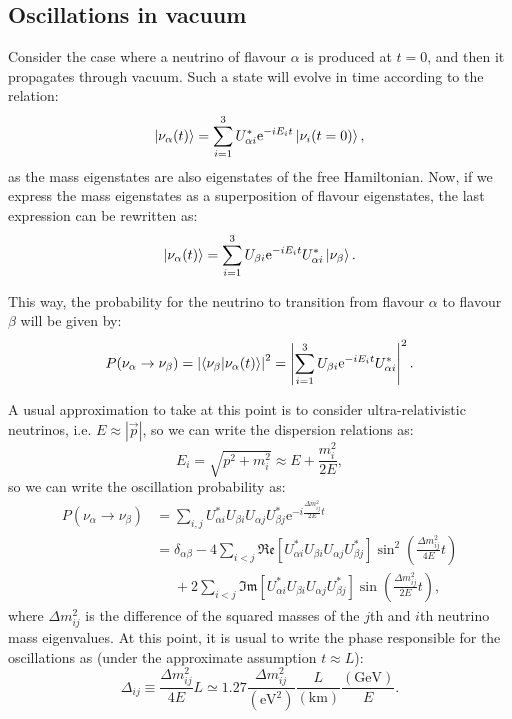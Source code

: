 \subsection{Oscillations in vacuum}

Consider the case where a neutrino of flavour $\alpha$ is produced at $t=0$, and then it propagates through vacuum. Such a state will evolve in time according to the relation:
\begin{equation}\label{2.3}
\ket{\nu_{\alpha}(t)} = \sum_{i=1}^{3} U^{*}_{\alpha i} \mathrm{e}^{-iE_{i}t} \ket{\nu_{i}(t=0)},
\end{equation}
as the mass eigenstates are also eigenstates of the free Hamiltonian. Now, if we express the mass eigenstates as a superposition of flavour eigenstates, the last expression can be rewritten as:
\begin{equation}\label{2.4}
\ket{\nu_{\alpha}(t)} = \sum_{i=1}^{3} U_{\beta i} \mathrm{e}^{-iE_{i}t} U^{*}_{\alpha i} \ket{\nu_{\beta}}.
\end{equation}

This way, the probability for the neutrino to transition from flavour $\alpha$ to flavour $\beta$ will be given by:
\begin{equation}\label{2.5}
P(\nu_{\alpha} \rightarrow \nu_{\beta}) = \left|\braket{\nu_{\beta}}{\nu_{\alpha}(t)}\right|^{2}=\left|\sum_{i=1}^{3} U_{\beta i} \mathrm{e}^{-iE_{i}t} U^{*}_{\alpha i}\right|^{2}.
\end{equation}

A usual approximation to take at this point is to consider ultra-relativistic neutrinos, i.e. $E \approx \left|\vec{p}\right|$, so we can write the dispersion relations as:
\begin{equation}\label{2.6}
E_{i} = \sqrt{p^{2} + m_{i}^{2}} \approx E + \frac{m_{i}^{2}}{2 E},
\end{equation}
so we can write the oscillation probability as:
\begin{equation}\label{2.7}
\begin{split}
P(\nu_{\alpha} \rightarrow \nu_{\beta}) &= \sum_{i,j} U^{*}_{\alpha i} U_{\beta i} U_{\alpha j} U^{*}_{\beta j} \mathrm{e}^{-i\frac{\Delta m^{2}_{ij}}{2E}t}\\
&=\delta_{\alpha\beta} - 4 \sum_{i<j} \mathfrak{Re}\left[U^{*}_{\alpha i} U_{\beta i} U_{\alpha j} U^{*}_{\beta j}\right] \sin^{2}\left(\frac{\Delta m^{2}_{ij}}{4E}t\right)\\
&\phantom{=}+ 2  \sum_{i<j} \mathfrak{Im}\left[U^{*}_{\alpha i} U_{\beta i} U_{\alpha j} U^{*}_{\beta j}\right] \sin\left(\frac{\Delta m^{2}_{ij}}{2E}t\right),
\end{split}
\end{equation}
where $\Delta m^{2}_{ij}$ is the difference of the squared masses of the $j$th and $i$th neutrino mass eigenvalues. At this point, it is usual to write the phase responsible for the oscillations as (under the approximate assumption $t \approx L$):
\begin{equation}\label{2.8}
\Delta_{ij} \equiv \frac{\Delta m^{2}_{ij}}{4E}L \simeq 1.27 \frac{\Delta m^{2}_{ij}}{(\mathrm{eV}^{2})} \frac{L}{(\mathrm{km})} \frac{(\mathrm{GeV})}{E}.
\end{equation}


